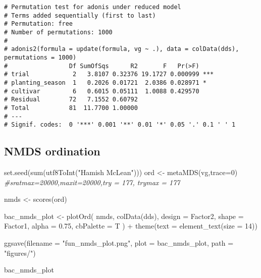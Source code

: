 \documentclass[
]{article}
\newenvironment{Shaded}{\begin{snugshade}}{\end{snugshade}}
\newcommand{\AttributeTok}[1]{\textcolor[rgb]{0.77,0.63,0.00}{#1}}
\newcommand{\CommentTok}[1]{\textcolor[rgb]{0.56,0.35,0.01}{\textit{#1}}}
\newcommand{\DecValTok}[1]{\textcolor[rgb]{0.00,0.00,0.81}{#1}}
\newcommand{\FloatTok}[1]{\textcolor[rgb]{0.00,0.00,0.81}{#1}}
\newcommand{\FunctionTok}[1]{\textcolor[rgb]{0.00,0.00,0.00}{#1}}
\newcommand{\NormalTok}[1]{#1}
\newcommand{\OtherTok}[1]{\textcolor[rgb]{0.56,0.35,0.01}{#1}}
\newcommand{\SpecialCharTok}[1]{\textcolor[rgb]{0.00,0.00,0.00}{#1}}
\newcommand{\StringTok}[1]{\textcolor[rgb]{0.31,0.60,0.02}{#1}}
\begin{document}
\begin{verbatim}
# Permutation test for adonis under reduced model
# Terms added sequentially (first to last)
# Permutation: free
# Number of permutations: 1000
# 
# adonis2(formula = update(formula, vg ~ .), data = colData(dds), permutations = 1000)
#                 Df SumOfSqs      R2       F   Pr(>F)    
# trial            2   3.8107 0.32376 19.1727 0.000999 ***
# planting_season  1   0.2026 0.01721  2.0386 0.028971 *  
# cultivar         6   0.6015 0.05111  1.0088 0.429570    
# Residual        72   7.1552 0.60792                     
# Total           81  11.7700 1.00000                     
# ---
# Signif. codes:  0 '***' 0.001 '**' 0.01 '*' 0.05 '.' 0.1 ' ' 1
\end{verbatim}

\hypertarget{nmds-ordination-1}{%
\subsection{NMDS ordination}\label{nmds-ordination-1}}

\begin{Shaded}
\begin{Highlighting}[]
\FunctionTok{set.seed}\NormalTok{(}\FunctionTok{sum}\NormalTok{(}\FunctionTok{utf8ToInt}\NormalTok{(}\StringTok{"Hamish McLean"}\NormalTok{)))}
\NormalTok{ord }\OtherTok{\textless{}{-}} \FunctionTok{metaMDS}\NormalTok{(vg,}\AttributeTok{trace=}\DecValTok{0}\NormalTok{) }
\CommentTok{\#sratmax=20000,maxit=20000,try = 177, trymax = 177}

\NormalTok{nmds }\OtherTok{\textless{}{-}} \FunctionTok{scores}\NormalTok{(ord)}

\NormalTok{bac\_nmds\_plot }\OtherTok{\textless{}{-}} \FunctionTok{plotOrd}\NormalTok{(}
\NormalTok{  nmds, }\FunctionTok{colData}\NormalTok{(dds), }\AttributeTok{design =}\NormalTok{ Factor2, }
  \AttributeTok{shape =}\NormalTok{ Factor1, }\AttributeTok{alpha =} \FloatTok{0.75}\NormalTok{, }\AttributeTok{cbPalette =}\NormalTok{ T}
\NormalTok{) }\SpecialCharTok{+} \FunctionTok{theme}\NormalTok{(}\AttributeTok{text =} \FunctionTok{element\_text}\NormalTok{(}\AttributeTok{size =} \DecValTok{14}\NormalTok{))}

\FunctionTok{ggsave}\NormalTok{(}\AttributeTok{filename =} \StringTok{"fun\_nmds\_plot.png"}\NormalTok{, }\AttributeTok{plot =}\NormalTok{ bac\_nmds\_plot, }\AttributeTok{path =} \StringTok{"figures/"}\NormalTok{)}

\NormalTok{bac\_nmds\_plot}
\end{Highlighting}
\end{Shaded}
\end{document}
